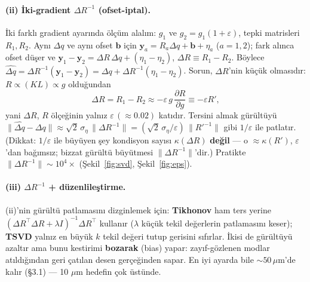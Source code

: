 \documentclass[twocolumn,a4paper,10pt]{article}
\begin{document}
\paragraph{(ii) İki-gradient $\Delta R^{-1}$ (ofset-iptal).} İki farklı gradient
ayarında ölçüm alalım: $g_1$ ve $g_2=g_1(1+\varepsilon)$, tepki matrisleri
$R_1,R_2$. Aynı $\Delta q$ ve aynı ofset $\mathbf b$ için
$\mathbf y_a=R_a\Delta q+\mathbf b+\eta_a$ ($a=1,2$); fark alınca ofset düşer ve
$\mathbf y_1-\mathbf y_2=\Delta R\,\Delta q+(\eta_1-\eta_2)$, $\Delta R\equiv R_1-R_2$.
Böylece $\widehat{\Delta q}=\Delta R^{-1}(\mathbf y_1-\mathbf y_2)=
\Delta q+\Delta R^{-1}(\eta_1-\eta_2)$. Sorun, $\Delta R$'nin küçük olmasıdır:
$R\propto(KL)\propto g$ olduğundan
\begin{equation}
\Delta R=R_1-R_2\approx-\varepsilon\,g\,\frac{\partial R}{\partial g}\equiv-\varepsilon R',
\end{equation}
yani $\Delta R$, $R$ ölçeğinin yalnız $\varepsilon\,(\approx0.02)$ katıdır.
Tersini almak gürültüyü
$\|\widehat{\Delta q}-\Delta q\|\approx\sqrt2\,\sigma_\eta\,\|\Delta R^{-1}\|=
(\sqrt2\,\sigma_\eta/\varepsilon)\,\|R'^{-1}\|$ gibi $1/\varepsilon$ ile
patlatır. (Dikkat: $1/\varepsilon$ ile büyüyen şey kondisyon sayısı
$\kappa(\Delta R)$ \textbf{değil} --- o $\approx\kappa(R')$, $\varepsilon$'dan
bağımsız; bizzat gürültü büyütmesi $\|\Delta R^{-1}\|$'dir.) Pratikte
$\|\Delta R^{-1}\|\sim10^4\times$ (Şekil~\ref{fig:svd}, Şekil~\ref{fig:eps}).

\paragraph{(iii) $\Delta R^{-1}$ + düzenlileştirme.} (ii)'nin gürültü patlamasını
dizginlemek için: \textbf{Tikhonov} ham ters yerine
$(\Delta R^\top\Delta R+\lambda I)^{-1}\Delta R^\top$ kullanır ($\lambda$ küçük
tekil değerlerin patlamasını keser); \textbf{TSVD} yalnız en büyük $k$ tekil
değeri tutup gerisini sıfırlar. İkisi de gürültüyü azaltır ama bunu kestirimi
\textbf{bozarak} (bias) yapar: zayıf-gözlenen modlar atıldığından geri çatılan
desen gerçeğinden sapar. En iyi ayarda bile $\sim50\,\mu$m'de kalır (\S3.1) ---
10 $\mu$m hedefin çok üstünde.
\end{document}
